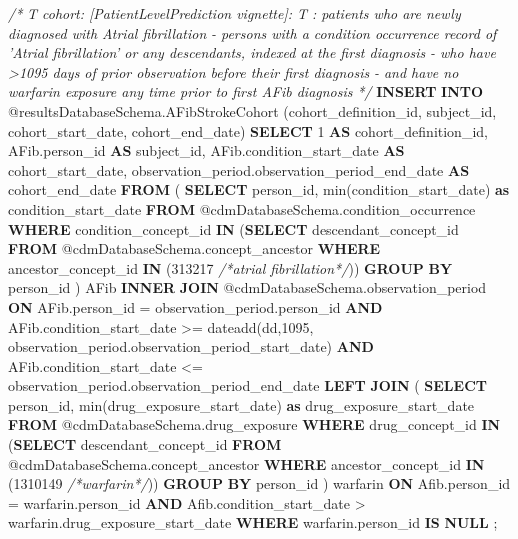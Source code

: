 \documentclass[]{article}
\newenvironment{Shaded}{\begin{snugshade}}{\end{snugshade}}
\newcommand{\KeywordTok}[1]{\textcolor[rgb]{0.13,0.29,0.53}{\textbf{#1}}}
\newcommand{\DecValTok}[1]{\textcolor[rgb]{0.00,0.00,0.81}{#1}}
\newcommand{\CommentTok}[1]{\textcolor[rgb]{0.56,0.35,0.01}{\textit{#1}}}
\newcommand{\FunctionTok}[1]{\textcolor[rgb]{0.00,0.00,0.00}{#1}}
\newcommand{\NormalTok}[1]{#1}
\begin{document}
\begin{Shaded}
\begin{Highlighting}[]
\CommentTok{/*}
\CommentTok{  T cohort:  [PatientLevelPrediction vignette]:  T : patients who are newly }
\CommentTok{             diagnosed with Atrial fibrillation}
\CommentTok{  - persons with a condition occurrence record of 'Atrial fibrillation' or }
\CommentTok{    any descendants, indexed at the first diagnosis}
\CommentTok{  - who have >1095 days of prior observation before their first diagnosis}
\CommentTok{  - and have no warfarin exposure any time prior to first AFib diagnosis}
\CommentTok{*/}
\KeywordTok{INSERT} \KeywordTok{INTO}\NormalTok{ @resultsDatabaseSchema.AFibStrokeCohort (cohort_definition_id, subject_id, }
\NormalTok{                                                     cohort_start_date, cohort_end_date)}
\KeywordTok{SELECT} \DecValTok{1} \KeywordTok{AS}\NormalTok{ cohort_definition_id,}
\NormalTok{  AFib.person_id }\KeywordTok{AS}\NormalTok{ subject_id,}
\NormalTok{  AFib.condition_start_date }\KeywordTok{AS}\NormalTok{ cohort_start_date,}
\NormalTok{  observation_period.observation_period_end_date }\KeywordTok{AS}\NormalTok{ cohort_end_date}
\KeywordTok{FROM}
\NormalTok{(}
  \KeywordTok{SELECT}\NormalTok{ person_id, }\FunctionTok{min}\NormalTok{(condition_start_date) }\KeywordTok{as}\NormalTok{ condition_start_date}
  \KeywordTok{FROM}\NormalTok{ @cdmDatabaseSchema.condition_occurrence}
  \KeywordTok{WHERE}\NormalTok{ condition_concept_id }\KeywordTok{IN}\NormalTok{ (}\KeywordTok{SELECT}\NormalTok{ descendant_concept_id }\KeywordTok{FROM} 
\NormalTok{        @cdmDatabaseSchema.concept_ancestor }\KeywordTok{WHERE}\NormalTok{ ancestor_concept_id }\KeywordTok{IN} 
\NormalTok{        (}\DecValTok{313217} \CommentTok{/*atrial fibrillation*/}\NormalTok{))}
  \KeywordTok{GROUP} \KeywordTok{BY}\NormalTok{ person_id}
\NormalTok{) AFib}
\KeywordTok{INNER} \KeywordTok{JOIN}\NormalTok{ @cdmDatabaseSchema.observation_period}
  \KeywordTok{ON}\NormalTok{ AFib.person_id = observation_period.person_id}
  \KeywordTok{AND}\NormalTok{ AFib.condition_start_date >= dateadd(dd,}\DecValTok{1095}\NormalTok{, }
\NormalTok{                                   observation_period.observation_period_start_date)}
  \KeywordTok{AND}\NormalTok{ AFib.condition_start_date <= observation_period.observation_period_end_date}
\KeywordTok{LEFT} \KeywordTok{JOIN}
\NormalTok{(}
  \KeywordTok{SELECT}\NormalTok{ person_id, }\FunctionTok{min}\NormalTok{(drug_exposure_start_date) }\KeywordTok{as}\NormalTok{ drug_exposure_start_date}
  \KeywordTok{FROM}\NormalTok{ @cdmDatabaseSchema.drug_exposure}
  \KeywordTok{WHERE}\NormalTok{ drug_concept_id }\KeywordTok{IN}\NormalTok{ (}\KeywordTok{SELECT}\NormalTok{ descendant_concept_id }\KeywordTok{FROM} 
\NormalTok{       @cdmDatabaseSchema.concept_ancestor }\KeywordTok{WHERE}\NormalTok{ ancestor_concept_id }\KeywordTok{IN} 
\NormalTok{       (}\DecValTok{1310149} \CommentTok{/*warfarin*/}\NormalTok{))}
  \KeywordTok{GROUP} \KeywordTok{BY}\NormalTok{ person_id}
\NormalTok{) warfarin}
  \KeywordTok{ON}\NormalTok{ Afib.person_id = warfarin.person_id}
  \KeywordTok{AND}\NormalTok{ Afib.condition_start_date > warfarin.drug_exposure_start_date}
\KeywordTok{WHERE}\NormalTok{ warfarin.person_id }\KeywordTok{IS} \KeywordTok{NULL}
\NormalTok{;}


\end{Highlighting}
\end{Shaded}
\end{document}
